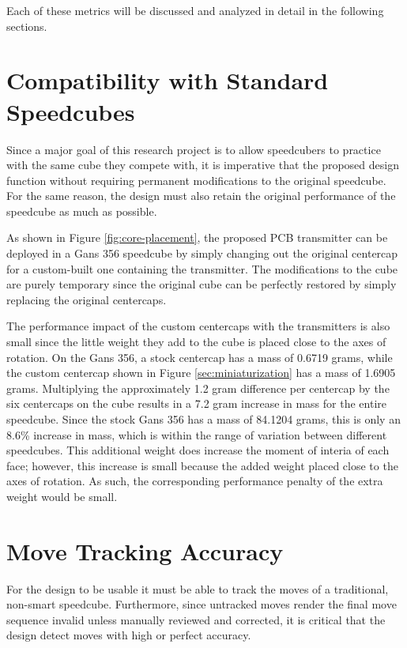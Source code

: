 Each of these metrics will be discussed and analyzed in detail in the
following sections.

\section{Compatibility with Standard Speedcubes}
\label{sec:compatibility-with-standard-speedcubes}

Since a major goal of this research project is to allow speedcubers to
practice with the same cube they compete with, it is imperative that
the proposed design function without requiring permanent modifications
to the original speedcube. For the same reason, the design must also
retain the original performance of the speedcube as much as possible.

As shown in Figure \ref{fig:core-placement}, the proposed PCB
transmitter can be deployed in a Gans 356 speedcube by simply changing
out the original centercap for a custom-built one containing the
transmitter. The modifications to the cube are purely temporary since
the original cube can be perfectly restored by simply replacing the
original centercaps.

The performance impact of the custom centercaps with the transmitters
is also small since the little weight they add to the cube is placed
close to the axes of rotation. On the Gans 356, a stock centercap has a
mass of 0.6719 grams, while the custom centercap shown in Figure
\ref{sec:miniaturization} has a mass of 1.6905 grams. Multiplying the
approximately 1.2 gram difference per centercap by the six centercaps
on the cube results in a 7.2 gram increase in mass for the entire
speedcube. Since the stock Gans 356 has a mass of 84.1204 grams, this
is only an 8.6\% increase in mass, which is within the range of
variation between different speedcubes. This additional weight does
increase the moment of interia of each face; however, this increase is
small because the added weight placed close to the axes of rotation. As
such, the corresponding performance penalty of the extra weight would
be small.


\section{Move Tracking Accuracy}
\label{sec:move-tracking-accuracy}

For the design to be usable it must be able to track the moves of a
traditional, non-smart speedcube. Furthermore, since untracked moves
render the final move sequence invalid unless manually reviewed and
corrected, it is critical that the design detect moves with high or
perfect accuracy.

